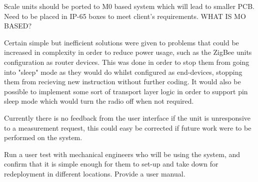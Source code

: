 Scale units should be ported to M0 based system which will lead to smaller PCB. Need to be placed in IP-65 boxes to meet client's requirements.
WHAT IS MO BASED?

Certain simple but inefficient solutions were given to problems that could be increased in complexity in order to reduce power usage, such as the ZigBee units configuration as router devices. This was done in order to stop them from going into "sleep" mode as they would do whilst configured as end-devices, stopping them from recieving new instruction without further coding. It would also be possible to implement some sort of transport layer logic in order to support pin sleep mode which would turn the radio off when not required.

Currently there is no feedback from the user interface if the unit is unresponsive to a measurement request, this could easy be corrected if future work were to be performed on the system. 

Run a user test with mechanical engineers who will be using the system, and confirm that it is simple enough for them to set-up and take down for redeployment in different locations. Provide a user manual.
